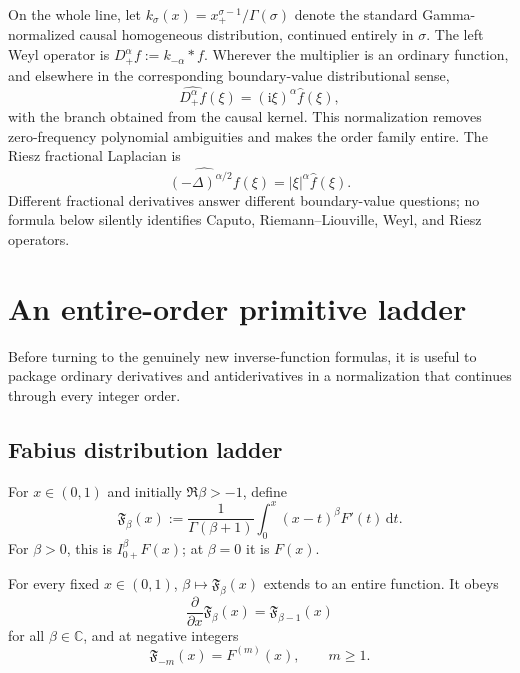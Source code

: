 \documentclass[11pt,oneside]{article}
\theoremstyle{definition}
\theoremstyle{remark}
\newcommand{\C}{\mathbb C}
\newcommand{\dd}{\,\mathrm d}
\newcommand{\ii}{\mathrm i}
\newcommand{\1}{\mathbf 1}
\begin{document}
On the whole line, let
$k_\sigma(x)=x_+^{\sigma-1}/\Gamma(\sigma)$ denote the standard
Gamma-normalized causal homogeneous distribution, continued entirely in
$\sigma$.  The left Weyl operator is
$D_+^\alpha f:=k_{-\alpha}*f$.  Wherever the multiplier is an ordinary
function, and elsewhere in the corresponding boundary-value distributional
sense,
\begin{equation}
 \widehat{D_+^\alpha f}(\xi)=(\ii\xi)^\alpha\widehat f(\xi),
 \label{p11:eq:Weyl-def}
\end{equation}
with the branch obtained from the causal kernel.  This normalization removes
zero-frequency polynomial ambiguities and makes the order family entire.  The
Riesz fractional Laplacian is
\begin{equation}
 \widehat{(-\Delta)^{\alpha/2}f}(\xi)=|\xi|^\alpha\widehat f(\xi).
 \label{p11:eq:Riesz-def}
\end{equation}
Different fractional derivatives answer different boundary-value questions;
no formula below silently identifies Caputo, Riemann--Liouville, Weyl, and
Riesz operators.

\section{An entire-order primitive ladder}
\label{p11:sec:entire-ladder}

Before turning to the genuinely new inverse-function formulas, it is useful
to package ordinary derivatives and antiderivatives in a normalization that
continues through every integer order.

\subsection{Fabius distribution ladder}

For $x\in(0,1)$ and initially $\Re\beta>-1$, define
\begin{equation}
 \mathfrak F_\beta(x)
 :=\frac1{\Gamma(\beta+1)}
   \int_0^x(x-t)^\beta F'(t)\dd t.
 \label{p11:eq:F-entire-ladder}
\end{equation}
For $\beta>0$, this is $I_{0+}^{\beta}F(x)$; at $\beta=0$ it is $F(x)$.

\begin{proposition}
For every fixed $x\in(0,1)$, $\beta\mapsto\mathfrak F_\beta(x)$ extends to an
entire function.  It obeys
\begin{equation}
 \frac{\partial}{\partial x}\mathfrak F_\beta(x)
 =\mathfrak F_{\beta-1}(x)
 \label{p11:eq:F-order-ladder}
\end{equation}
for all $\beta\in\C$, and at negative integers
\begin{equation}
 \mathfrak F_{-m}(x)=F^{(m)}(x),\qquad m\ge1.
 \label{p11:eq:F-negative-orders}
\end{equation}
\end{proposition}
\end{document}
